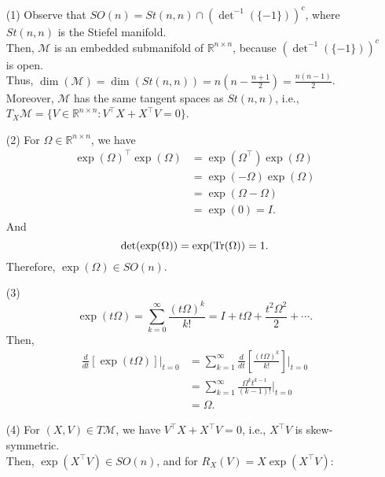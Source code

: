 \documentclass[en, oneside]{assignment}
\begin{document}
\begin{sol}
    \begin{itemize}
        \item[(1)] Observe that $SO(n) = St(n, n) \cap (\det^{-1}(\{-1\}))^c$, where $St(n, n)$ is the Stiefel manifold.\\
        Then, $\mathcal{M}$ is an embedded submanifold of $\mathbb{R}^{n \times n}$, because $(\det^{-1}(\{-1\}))^c$ is open.\\
        Thus, $\dim(\mathcal{M}) = \dim(St(n, n)) = n(n - \frac{n+1}{2}) = \frac{n(n-1)}{2}$.\\
        Moreover, $\mathcal{M}$ has the same tangent spaces as $St(n, n)$, 
        i.e., $T_X\mathcal{M} = \{V \in \mathbb{R}^{n \times n}: V^\top X + X^\top V = 0\}$.
        \item[(2)] For $\Omega \in \mathbb{R}^{n \times n}$, we have
        \begin{align*}
            \exp(\Omega)^\top \exp(\Omega) & = \exp(\Omega^\top) \exp(\Omega)\\
            & = \exp(-\Omega) \exp(\Omega)\\
            & = \exp(\Omega - \Omega)\\
            & = \exp(0) = I.
        \end{align*}
        And
        \begin{equation*}
            \det(\exp(\Omega)) = \exp(\operatorname{Tr}(\Omega)) = 1.
        \end{equation*}
        Therefore, $\exp(\Omega) \in SO(n)$.
        \item[(3)] \begin{equation*}
            \exp(t\Omega) = \sum_{k=0}^\infty \frac{(t\Omega)^k}{k!} = I + t\Omega + \frac{t^2\Omega^2}{2} + \cdots.
        \end{equation*}
        Then, 
        \begin{align*}
            \frac{d}{dt}[\exp(t\Omega)]|_{t=0} & = \sum_{k=1}^\infty \frac{d}{dt}[\frac{(t\Omega)^k}{k!}]|_{t=0}\\
            & = \sum_{k=1}^\infty \frac{\Omega^k t^{k-1}}{(k-1)!}|_{t=0}\\
            & = \Omega.
        \end{align*}
        \item[(4)] For $(X, V) \in T\mathcal{M}$, we have $V^\top X + X^\top V = 0$, i.e., $X^\top V$ is skew-symmetric.\\
        Then, $\exp(X^\top V) \in SO(n)$, and for $R_X(V) = X \exp(X^\top V)$:
        \begin{align*}

\end{align*}
\end{itemize}
\end{sol}
\end{document}
